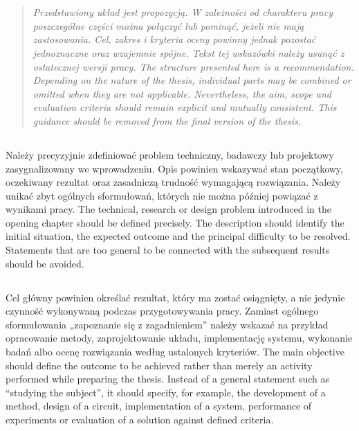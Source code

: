 \chapter{}


\begin{quote}
\itshape
\ploren
  {Przedstawiony układ jest propozycją. W zależności od charakteru pracy poszczególne części można połączyć lub pominąć, jeżeli nie mają zastosowania. Cel, zakres i kryteria oceny powinny jednak pozostać jednoznaczne oraz wzajemnie spójne. Tekst tej wskazówki należy usunąć z ostatecznej wersji pracy.}
  {The structure presented here is a recommendation. Depending on the nature of the thesis, individual parts may be combined or omitted when they are not applicable. Nevertheless, the aim, scope and evaluation criteria should remain explicit and mutually consistent. This guidance should be removed from the final version of the thesis.}
\end{quote}

\section{}

\ploren
  {Należy precyzyjnie zdefiniować problem techniczny, badawczy lub projektowy zasygnalizowany we wprowadzeniu. Opis powinien wskazywać stan początkowy, oczekiwany rezultat oraz zasadniczą trudność wymagającą rozwiązania. Należy unikać zbyt ogólnych sformułowań, których nie można później powiązać z wynikami pracy.}
  {The technical, research or design problem introduced in the opening chapter should be defined precisely. The description should identify the initial situation, the expected outcome and the principal difficulty to be resolved. Statements that are too general to be connected with the subsequent results should be avoided.}

\section{}

\ploren
  {Cel główny powinien określać rezultat, który ma zostać osiągnięty, a nie jedynie czynność wykonywaną podczas przygotowywania pracy. Zamiast ogólnego sformułowania „zapoznanie się z zagadnieniem” należy wskazać na przykład opracowanie metody, zaprojektowanie układu, implementację systemu, wykonanie badań albo ocenę rozwiązania według ustalonych kryteriów.}
  {The main objective should define the outcome to be achieved rather than merely an activity performed while preparing the thesis. Instead of a general statement such as “studying the subject”, it should specify, for example, the development of a method, design of a circuit, implementation of a system, performance of experiments or evaluation of a solution against defined criteria.}

